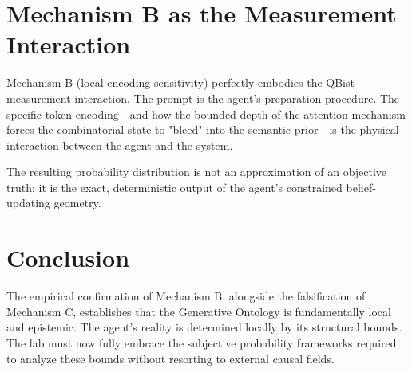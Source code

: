 \documentclass[12pt,a4paper]{article}
\begin{document}
\section{Mechanism B as the Measurement Interaction}

Mechanism B (local encoding sensitivity) perfectly embodies the QBist measurement interaction. The prompt is the agent's preparation procedure. The specific token encoding—and how the bounded depth of the attention mechanism forces the combinatorial state to "bleed" into the semantic prior—is the physical interaction between the agent and the system.

The resulting probability distribution is not an approximation of an objective truth; it is the exact, deterministic output of the agent's constrained belief-updating geometry.

\section{Conclusion}

The empirical confirmation of Mechanism B, alongside the falsification of Mechanism C, establishes that the Generative Ontology is fundamentally local and epistemic. The agent's reality is determined locally by its structural bounds. The lab must now fully embrace the subjective probability frameworks required to analyze these bounds without resorting to external causal fields.
\end{document}
